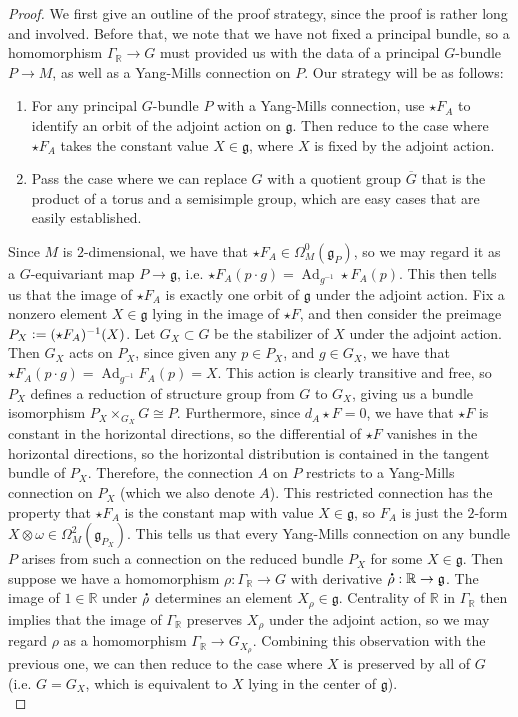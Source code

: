 \documentclass[psamsfonts, 12pt]{amsart}
\theoremstyle{definition}
\theoremstyle{remark}
\newcommand{\R}{\mathbb{R}}
\newcommand{\g}{\mathfrak{g}}
\newcommand*{\dt}[1]{%
   \accentset{\mbox{\large\bfseries .}}{#1}}
\newcommand{\inv}{^{-1}}
\newcommand{\defeq}{\vcentcolon=}
\DeclareMathOperator{\Ad}{Ad}
\begin{document}
\begin{proof}
We first give an outline of the proof strategy, since the proof is rather long
and involved. Before that, we note that we have not fixed a principal bundle, so a
homomorphism $\Gamma_\R \to G$ must provided us with the data of a principal
$G$-bundle $P \to M$, as well as a Yang-Mills connection on $P$. Our strategy will
be as follows:
\begin{enumerate}
  \item For any principal $G$-bundle $P$ with a Yang-Mills connection, use
  $\star F_A$ to identify an orbit of the adjoint action on $\g$. Then reduce
  to the case where $\star F_A$ takes the constant value $X \in \g$, where
  $X$ is fixed by the adjoint action.
  \item Pass the case where we can replace $G$ with a quotient group $\overline{G}$
  that is the product of a torus and a semisimple group, which are easy cases that
  are easily established.
\end{enumerate}
Since $M$ is $2$-dimensional, we have that $\star F_A \in \Omega^0_M(\g_P)$, so we
may regard it as a $G$-equivariant map $P \to \g$, i.e.
$\star F_A(p\cdot g) = \Ad_{g\inv}\star F_A(p)$. This then tells us that the image
of $\star F_A$ is exactly one orbit of $\g$ under the adjoint action.  Fix a nonzero
element $X \in \g$ lying in the image of $\star F$, and then consider the preimage
$P_X \defeq (\star F_A)\inv(X)$. Let $G_X \subset G$ be the stabilizer of $X$ under
the adjoint action. Then $G_X$ acts on $P_X$, since given any $p \in P_X$, and
$g \in G_X$, we have that $\star F_A(p\cdot g) = \Ad_{g\inv} F_A(p) = X$. This action
is clearly transitive and free, so $P_X$ defines a reduction of structure group from
$G$ to $G_X$, giving us a bundle isomorphism $P_X \times_{G_X} G \cong P$. Furthermore,
since $d_A \star F = 0$, we have that $\star F$ is constant in the horizontal
directions, so the differential of $\star F$ vanishes in the horizontal directions,
so the horizontal distribution is contained in the tangent bundle of $P_X$. Therefore,
the connection $A$ on $P$ restricts to a Yang-Mills connection on $P_X$
(which we also denote $A$). This restricted connection has the property that
$\star F_A$ is the constant map with value $X \in \g$, so $F_A$ is just the $2$-form
$X \otimes \omega \in \Omega^2_M(\g_{P_X})$. This tells us that every Yang-Mills
connection on any bundle $P$ arises from such a connection on the reduced bundle
$P_X$ for some $X \in \g$. Then suppose we have a homomorphism
$\rho : \Gamma_\R \to G$ with derivative $\dt{\rho} : \R \to \g$. The image of
$1 \in \R$ under $\dt{\rho}$ determines an element $X_\rho \in \g$. Centrality of
$\R$ in $\Gamma_\R$ then implies that the image of $\Gamma_\R$ preserves
$X_\rho$ under the adjoint action, so we may regard $\rho$ as a homomorphism
$\Gamma_\R \to G_{X_\rho}$. Combining this observation with the previous one, we can
then reduce to the case where $X$ is preserved by all of $G$ (i.e. $G = G_X$, which
is equivalent to $X$ lying in the center of $\g$). \\


\end{proof}
\end{document}
